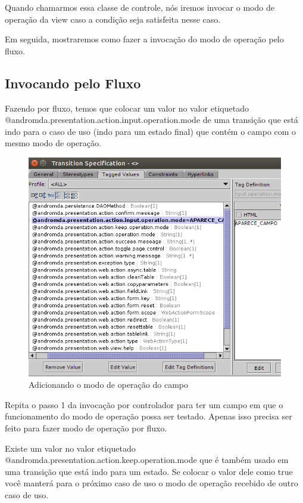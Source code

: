 Quando chamarmos essa classe de controle, nós iremos invocar o modo de operação
da view caso a condição seja satisfeita nesse caso.

Em seguida, mostraremos como fazer a invocação do modo de operação pelo fluxo.

\subsection{Invocando pelo Fluxo}

Fazendo por fluxo, temos que colocar um valor no valor etiquetado
@andromda.presentation.action.input.operation.mode de uma transição que está
indo para o caso de uso (indo para um estado final) que contém o campo com o
mesmo modo de operação.

\begin{figure}[H]
	\centering
	\includegraphics[scale=0.75]{files/imgs/operation-mode-02.png}
	\caption{Adicionando o modo de operação do campo}
	\label{aicionando_modo_operacao_campo}
\end{figure}

Repita o passo 1 da invocação por controlador para ter um campo em que o
funcionamento do modo de operação possa ser testado. Apenas isso precisa ser
feito para fazer modo de operação por fluxo.

Existe um valor no valor etiquetado
@andromda.presentation.action.keep.operation.mode que é também usado em uma
transição que está indo para um estado. Se colocar o valor dele como true você
manterá para o próximo caso de uso o modo de operação recebido de outro caso de
uso.

